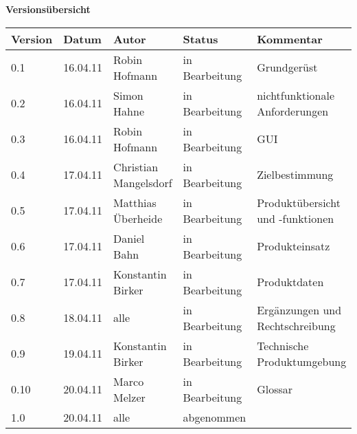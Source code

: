 

{\textbf{Versionsübersicht}}\\[2ex]

\begin{longtable}{|m{1.78cm}|m{1.59cm}|m{2.86cm}|m{1.9cm}|m{5.25cm}|}

  \hline                                              %

  \textbf{Version}  &    \textbf{Datum}  &    \textbf{Autor}  &
  \textbf{Status}   &    \textbf{Kommentar}  \\  %
  \hline                                              %

0.1&16.04.11&Robin Hofmann&in Bearbeitung&Grundgerüst\\
\hline 
0.2&16.04.11&Simon Hahne&in Bearbeitung&nichtfunktionale Anforderungen\\
\hline 
0.3&16.04.11&Robin Hofmann&in Bearbeitung&GUI\\
\hline 
0.4&17.04.11&Christian Mangelsdorf&in Bearbeitung&Zielbestimmung\\
\hline 
0.5&17.04.11&Matthias Überheide&in Bearbeitung&Produktübersicht und -funktionen\\
\hline 
0.6&17.04.11&Daniel Bahn&in Bearbeitung&Produkteinsatz\\
\hline 
0.7&17.04.11&Konstantin Birker&in Bearbeitung&Produktdaten\\
\hline 
0.8&18.04.11&alle&in Bearbeitung&Ergänzungen und Rechtschreibung\\
\hline 
0.9&19.04.11&Konstantin Birker&in Bearbeitung&Technische Produktumgebung\\
\hline 
0.10&20.04.11&Marco Melzer&in Bearbeitung&Glossar\\
\hline 
1.0&20.04.11&alle&abgenommen&\\
\hline 


\end{longtable}






